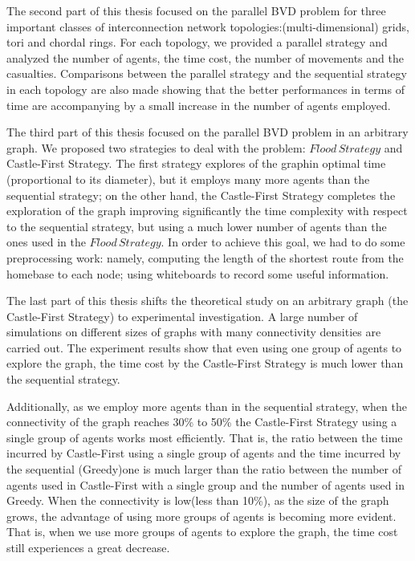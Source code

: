 The second part of this thesis focused on the parallel BVD problem for three important classes of interconnection network topologies:(multi-dimensional) grids, tori and chordal rings. For each topology, we provided a parallel strategy and analyzed the number of agents, the time cost, the number of movements and the casualties. Comparisons between the parallel strategy and the sequential strategy in each topology are also made showing that the better performances in terms of time are accompanying by a small increase in the number of agents employed.

The third part of this thesis focused on the parallel BVD problem in an arbitrary graph. We proposed two strategies to deal with the problem: $Flood\,Strategy$ and {\sc Castle-First} Strategy. The first strategy explores of the graphin optimal time (proportional to its diameter), but it employs  many more agents than the sequential strategy; on the other hand,  the {\sc Castle-First} Strategy  completes the exploration of the graph improving significantly the time complexity with respect to the sequential strategy,  but using a much lower number of agents   than the ones used in the $Flood\,Strategy$. In order to achieve this goal,  we had to  do some preprocessing  work: namely,  computing the length of the shortest route from the homebase to each node; using whiteboards to record some useful  information.

The last part of this thesis shifts the theoretical study on an arbitrary graph (the {\sc Castle-First} Strategy) to experimental investigation. A large number of simulations on different sizes of graphs with many connectivity densities are carried out. The experiment results show that even using one group of agents to explore the graph, 
the time cost by the  {\sc Castle-First} Strategy is much lower than the sequential strategy.
 
 Additionally, as we employ more agents than in the sequential strategy,
 when the connectivity of the graph reaches 30\% to 50\% 
 the {\sc Castle-First} Strategy using a single group of agents works most efficiently. 
 That is, the ratio between the time incurred by {\sc Castle-First} using a single group of agents and the time incurred by the sequential ({\sc Greedy})one  is much larger than the ratio between the number of agents used in {\sc Castle-First} with a single group and the number of agents used in {\sc Greedy}. 
 When the connectivity is low(less than 10\%), as the size of the graph grows, the advantage of using more groups of agents is becoming more evident. That is, when we use more groups of agents to explore the graph, the time cost still experiences a great decrease.


